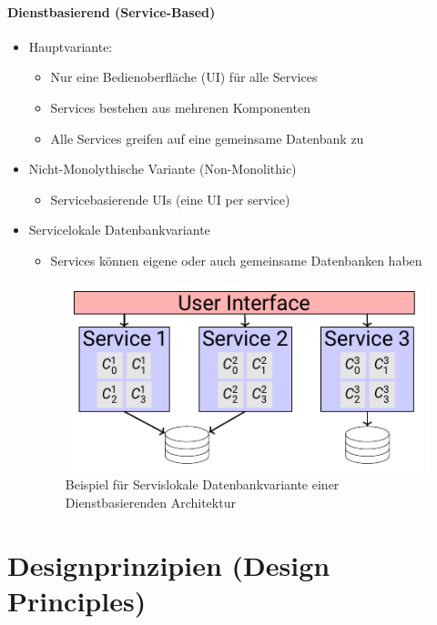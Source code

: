 \documentclass[
    ngerman,
    color=3b,
    summary,
    boxarc,
    main,
]{rubos-tuda-template}
\begin{document}
\paragraph{Dienstbasierend (Service-Based)}
\begin{itemize}
    \item Hauptvariante: \begin{itemize}
              \item Nur eine Bedienoberfläche (UI) für alle Services
              \item Services bestehen aus mehrenen Komponenten
              \item Alle Services greifen auf eine gemeinsame Datenbank zu
          \end{itemize}
    \item Nicht-Monolythische Variante (Non-Monolithic)\begin{itemize}
              \item Servicebasierende UIs (eine UI per service)
          \end{itemize}
    \item Servicelokale Datenbankvariante\begin{itemize}
              \item Services können eigene oder auch gemeinsame Datenbanken haben
          \end{itemize}
          \begin{figure}[ht]
              \centering
              \includegraphics{bilder/service_local_service_based_architecture_style.pdf}
              \caption{Beispiel für Servislokale Datenbankvariante einer Dienstbasierenden Architektur}
          \end{figure}
\end{itemize}

\clearpage
\section{Designprinzipien (Design Principles)}
\end{document}
